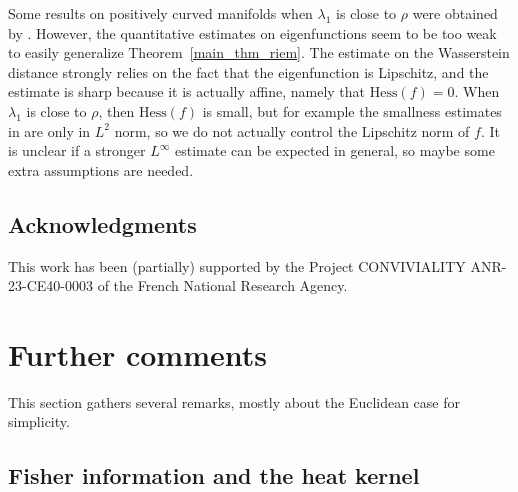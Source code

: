 \documentclass[10pt,reqno]{amsart}
\numberwithin{equation}{section}
\begin{document}
Some results on positively curved manifolds when $\lambda_1$ is close to
$\rho$ were obtained by \cite{CF20,MO21,BF22,FGS24}. However, the quantitative
estimates on eigenfunctions seem to be too weak to easily generalize
Theorem~\ref{main_thm_riem}. The estimate on the Wasserstein distance strongly
relies on the fact that the eigenfunction is Lipschitz, and the estimate is
sharp because it is actually affine, namely that $\mathrm{Hess}(f) = 0$. When
$\lambda_1$ is close to $\rho$, then $\mathrm{Hess}(f)$ is small, but for
example the smallness estimates in \cite{BF22} are only in $L^2$ norm, so we
do not actually control the Lipschitz norm of $f$. It is unclear if a stronger
$L^\infty$ estimate can be expected in general, so maybe some extra
assumptions are needed.

\subsection*{Acknowledgments}
This work has been (partially) supported by the Project CONVIVIALITY ANR-23-CE40-0003 of the French National Research Agency.    

\section{Further comments}

This section gathers several remarks, mostly about the Euclidean case for simplicity.

\subsection{Fisher information and the heat kernel}
\end{document}
